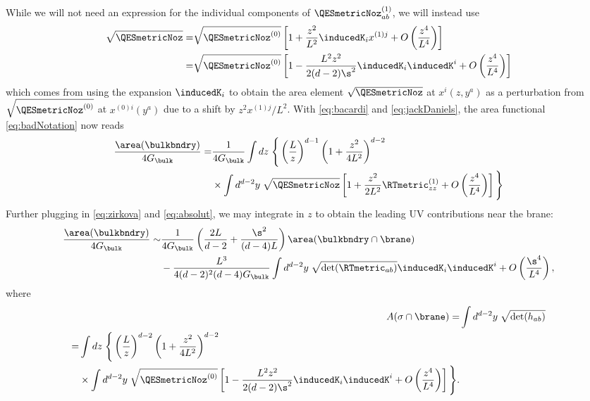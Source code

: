 While we will not need an expression for the individual components of $\QESmetricNoz^{(1)}_{ab}$, we will instead use
\begin{align}
  \sqrt{\QESmetricNoz}
  =& \sqrt{\QESmetricNoz^{(0)}}\left[
  1 + \frac{z^2}{L^2} \inducedK_i x^{(1)j}
  + O\left(\frac{z^4}{L^4}\right)
  \right]
  \\
  =& \sqrt{\QESmetricNoz^{(0)}}\left[
  1 - \frac{L^2 z^2}{2(d-2)\s^2} \inducedK_i \inducedK^i
  + O\left(\frac{z^4}{L^4}\right)
  \right]
  \label{eq:absolut}
\end{align}
which comes from using the expansion $\inducedK_i$ to obtain the area element $\sqrt{\QESmetricNoz}$ at $x^i(z,y^a)$ as a perturbation from $\sqrt{\QESmetricNoz^{(0)}}$ at $x^{(0)i}(y^a)$ due to a shift by $z^2 x^{(1)j}/L^2$. With \eqref{eq:bacardi} and \eqref{eq:jackDaniels}, the area functional \eqref{eq:badNotation} now reads
\begin{align}
  \begin{split}
  \frac{\area(\bulkbndry)}{4 G_\bulk}
  =& \frac{1}{4 G_\bulk} \int dz\;\Bigg\{
  \left(\frac{L}{z}\right)^{d-1}
  \left(1+\frac{z^2}{4L^2}\right)^{d-2}
  \\
  &\times \int d^{d-2}y\; \sqrt{
  \QESmetricNoz
  }
  \left[
  1 + \frac{z^2}{2L^2} \RTmetric^{(1)}_{zz}
  + O\left(\frac{z^4}{L^4}\right)
  \right]
  \Bigg\}
\end{split}
\end{align}
Further plugging in \eqref{eq:zirkova} and \eqref{eq:absolut}, we may integrate in $z$ to obtain the leading UV contributions near the brane:
\begin{align}
  \frac{\area(\bulkbndry)}{4 G_\bulk}
  \sim&
  \frac{1}{4 G_\bulk}
  \left(
  \frac{2L}{d-2}
  + \frac{\s^2}{(d-4)L}
  \right)\area(\bulkbndry\cap\brane)
  \\
  &- \frac{L^3}{4(d-2)^2 (d-4) G_\bulk}
  \int d^{d-2}y\; \sqrt{\det(\RTmetric_{ab})} \inducedK_i \inducedK^i
  + O\left(\frac{\s^4}{L^4}\right),
  \label{eq:bazinga}
  \end{align}
  where
  \begin{align}
  A(\sigma\cap\brane)
  =& \int d^{d-2}y\; \sqrt{\det(h_{ab})}
  \\
  \begin{split}
  =& \int dz\;\Bigg\{
  \left(\frac{L}{z}\right)^{d-2}
  \left(1+\frac{z^2}{4L^2}\right)^{d-2}
  \\
  &\times \int d^{d-2}y\;
  \sqrt{\QESmetricNoz^{(0)}}\left[
  1 - \frac{L^2 z^2}{2(d-2)\s^2} \inducedK_i \inducedK^i
  + O\left(\frac{z^4}{L^4}\right)
  \right]
  \Bigg\}.
\end{split}
\end{align}
